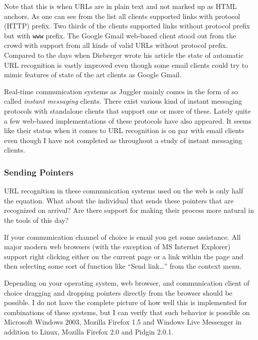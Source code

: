 \documentclass[12pt,a4paper]{article}
\begin{document}
Note that this is when URLs are in plain text and not marked up as
HTML anchors. As one can see from the list all clients supported links with
protocol (HTTP) prefix. Two thirds of the clients supported links without
protocol prefix but with \texttt{www} prefix. The Google Gmail web-based
client stood out from the crowd with support from all kinds of valid URLs
without protocol prefix. Compared to the days when Dieberger wrote his
article the state of automatic
URL recognition is vastly improved even though some email clients could try to
mimic features of state of the art clients as Google Gmail. 

Real-time communication systems as Juggler mainly comes in the form of so
called \emph{instant messaging} clients. There exist various kind of instant
messaging protocols with standalone clients that support one or more of these.
Lately quite a few web-based implementations of these protocols have also
appeared. It seems like their status when it comes to URL recognition is on
par with email clients even though I have not completed as throughout a study
of instant messaging clients.


\subsubsection{Sending Pointers}

URL recognition in these communication systems used on the web is only half
the equation. What about the individual that sends these pointers that are
recognized on arrival? Are there support for making their process more natural
in the tools of this day?

If your communication channel of choice is email you get some assistance. All
major modern web browsers (with the exception of MS Internet Explorer)
support right clicking either on the current page or
a link within the page and then selecting some sort of function like ``Send
link\ldots'' from the context menu.

Depending on your operating system, web browser, and communication
client of choice dragging and dropping pointers directly from the browser
should be possible. I do not have the complete picture of how well this is
implemented for combinations of these systems, but I can verify that such
behavior is possible on Microsoft Windows 2003, Mozilla Firefox 1.5 and
Windows Live Messenger in addition to Linux, Mozilla Firefox 2.0 and Pidgin
2.0.1.
\end{document}
